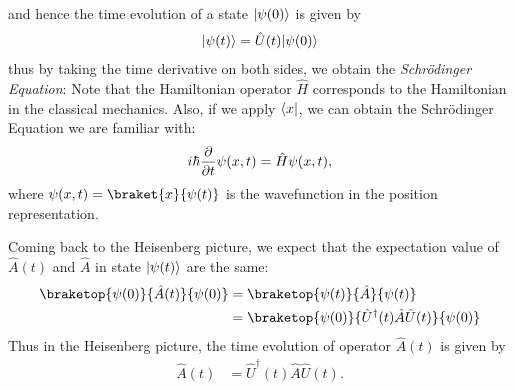 and hence the time evolution of a state $\lvert\psi(0)\rangle$ is given by
\begin{align}
  \lvert\psi(t)\rangle = \hat{U}(t) \lvert\psi(0)\rangle
\end{align}
thus by taking the time derivative on both sides, we obtain the \emph{Schrödinger Equation}:
Note that the Hamiltonian operator $\hat{H}$ corresponds to the Hamiltonian in the classical mechanics.
Also, if we apply $\langle x\rvert$, we can obtain the Schrödinger Equation we are familiar with:
\begin{align}
  i \hbar \pdv{}{t} \psi(x, t) = \hat{H} \psi(x, t),
\end{align}
where $\psi(x, t) = \braket{x}{\psi(t)}$ is the wavefunction in the position representation.

Coming back to the Heisenberg picture, we expect that the expectation value of $\hat{A}(t)$ and $\hat{A}$ in state $\lvert\psi(t)\rangle$ are the same:
\begin{align}
  \braketop{\psi(0)}{\hat{A}(t)}{\psi(0)} & = \braketop{\psi(t)}{\hat{A}}{\psi(t)}                               \\
                                          & = \braketop{\psi(0)}{\hat{U}^\dagger(t) \hat{A} \hat{U}(t)}{\psi(0)}
\end{align}
Thus in the Heisenberg picture, the time evolution of operator $\hat{A}(t)$ is given by
\begin{align}
  \hat{A}(t) & = \hat{U}^\dagger(t) \hat{A} \hat{U}(t).
\end{align}